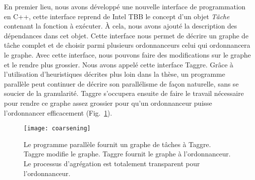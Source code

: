En premier lieu, nous avons développé une nouvelle interface de programmation en C++, cette interface reprend de Intel TBB le concept d'un objet {\em Tâche} contenant la fonction à exécuter.
%
\`A cela, nous avons ajouté la description des dépendances dans cet objet.
%
Cette interface nous permet de décrire un graphe de tâche complet et de choisir parmi plusieurs ordonnanceurs celui qui ordonnancera le graphe.
%
Avec cette interface, nous pouvons faire des modifications sur le graphe et le rendre plus grossier.
%
Nous avons appelé cette interface Taggre.
%
Grâce à l'utilisation d'heuristiques décrites plus loin dans la thèse, un programme parallèle peut continuer de décrire son parallélisme de façon naturelle, sans se soucier de la granularité.
%
Taggre s'occupera ensuite de faire le travail nécessaire pour rendre ce graphe assez grossier pour qu'un ordonnanceur puisse l'ordonnancer efficacement (Fig.~\ref{fig:coarsening}).

\begin{figure}[t!]
  \centering
  \texttt{[image: coarsening]}
  \caption{Le programme parallèle fournit un graphe de tâches à Taggre. Taggre modifie le graphe. Taggre fournit le graphe à l'ordonnanceur. Le processus d'agrégation est totalement transparent pour l'ordonnanceur.}
  \label{fig:coarsening}
\end{figure}



